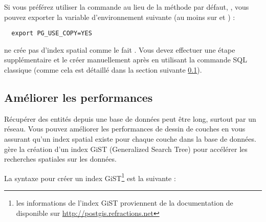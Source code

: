 Si vous préférez utiliser la commande \psq {} au lieu de la méthode par défaut, , vous pouvez exporter la variable d'environnement suivante (au moins sur \nix et \osx) :
\begin{verbatim}
  export PG_USE_COPY=YES
\end{verbatim}

 ne crée pas d'index spatial comme le fait . Vous devez effectuer une étape supplémentaire et le créer manuellement après en utilisant la commande SQL classique  (comme cela est détaillé dans la section suivante \ref{label_improve}).

\subsection{Améliorer les performances} \label{label_improve}

Récupérer des entités depuis une base de données \psq peut être long, surtout par un réseau. Vous pouvez améliorer les performances de dessin de couches \psq en vous assurant qu'un  index spatial existe pour chaque couche dans la base de données. \pg gère la création d'un index  GiST (Generalized Search Tree) pour accélérer les recherches spatiales sur les données.

La syntaxe pour créer un index GiST\footnote{les informations de l'index GiST proviennent de la documentation de \pg disponible sur \url{http://postgis.refractions.net}} est la suivante :

